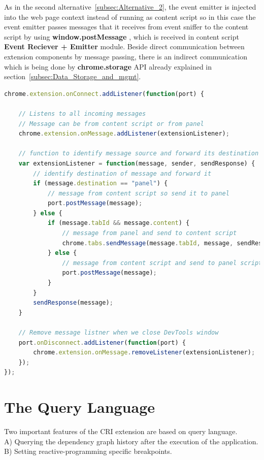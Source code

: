 As in the second alternative~\ref{subsec:Alternative_2}, the event emitter is injected into the web page context instead of running as content script so in this case the event emitter passes messages that it receives from event sniffer to the content script by using \textbf{window.postMessage} , which is received in content script \textbf{Event Reciever + Emitter} module.
Beside direct communication between extension components by message passing, there is an indirect communication which is being done by \textbf{chrome.storage} API already explained in section~\ref{subsec:Data_Storage_and_mgmt}.

\begin{lstlisting}[language=JavaScript, caption=Background Script to Communicate with Panel and Content Scripts, label={lst:imp_comm_background_code}]
chrome.extension.onConnect.addListener(function(port) {

	// Listens to all incoming messages
	// Message can be from content script or from panel
	chrome.extension.onMessage.addListener(extensionListener);
	
	// function to identify message source and forward its destination
	var extensionListener = function(message, sender, sendResponse) {
		// identify destination of message and forward it
		if (message.destination == "panel") {
			// message from content script so send it to panel
			port.postMessage(message);
		} else {
			if (message.tabId && message.content) {
				// message from panel and send to content script
				chrome.tabs.sendMessage(message.tabId, message, sendResponse);
			} else {
				// message from content script and send to panel script
				port.postMessage(message);
			}
		}
		sendResponse(message);
	}

	// Remove message listner when we close DevTools window
	port.onDisconnect.addListener(function(port) {
		chrome.extension.onMessage.removeListener(extensionListener);
	});
});
\end{lstlisting}


\section{The Query Language}  \label{sec:The Query Language}
Two important features of the CRI extension are based on query language.\\ 
A) Querying the dependency graph history after the execution of the application.\\ 
B) Setting reactive-programming specific breakpoints.\\ 

